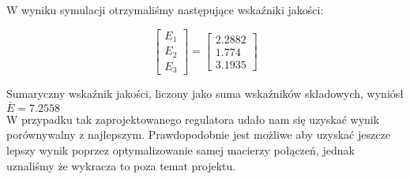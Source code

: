 W wyniku symulacji otrzymaliśmy następujące wskaźniki jakości:

\[
\begin{bmatrix}
    E_{\mathrm{1}} \\
    E_{\mathrm{2}} \\
    E_{\mathrm{3}} 
\end{bmatrix}
= 
\begin{bmatrix}
    \num{2.2882} \\
    \num{1.774} \\
    \num{3.1935}
\end{bmatrix}
\]

Sumaryczny wskaźnik jakości, liczony jako suma wskaźników składowych, 
wyniósł $\bar{E} = \num{7.2558}$\\

W przypadku tak zaprojektowanego regulatora udało nam się uzyskać wynik porównywalny z najlepszym.
Prawdopodobnie jest możliwe aby uzyskać jeszcze lepszy wynik poprzez optymalizowanie samej
macierzy połączeń, jednak uznaliśmy że wykracza to poza temat projektu.

